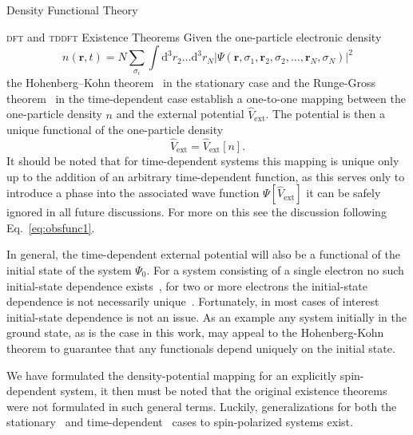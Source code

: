 \documentclass[letterpaper, 11 pt]{report}
\begin{document}
\begin{chapter}{Density Functional Theory \label{chap:dft}}
\begin{section}{\textsc{dft} and \textsc{tddft} Existence Theorems \label{sec:dft}}
      Given the one-particle electronic density
      \begin{equation} \label{eq:dendef1}
         n(\mathbf{r}, t) = N \sum\limits_{\sigma_i} \int \mathrm{d}^3 r_2 \dots \mathrm{d}^3 r_N
                            \left| \Psi(\mathbf{r}, \sigma_1, \mathbf{r}_2, \sigma_2, \dots,
                                   \mathbf{r}_N, \sigma_N) \right|^2
      \end{equation}
      the Hohenberg–Kohn theorem~\cite{hk-theorem} in the stationary case and the Runge-Gross
      theorem~\cite{rgt} in the time-dependent case establish a one-to-one mapping between the
      one-particle density $n$ and the external potential $\hat{V}_\mathrm{ext}$. The potential is
      then a unique functional of the one-particle density
      \begin{equation} \label{eq:vext-func}
         \hat{V}_\mathrm{ext} = \hat{V}_\mathrm{ext} [n].
      \end{equation}
      It should be noted that for time-dependent systems this mapping is unique only up to the addition
      of an arbitrary time-dependent function, as this serves only to introduce a phase into the
      associated wave function $\Psi[\hat{V}_\mathrm{ext}]$ it can be safely ignored in all future
      discussions. For more on this see the discussion following Eq.~\eqref{eq:obsfunc1}.

      In general, the time-dependent external potential will also be a functional of the initial state
      of the system $\Psi_0$. For a system consisting of a single electron no such initial-state
      dependence exists~\cite{initial1, initial1-erratum}, for two or more electrons the initial-state
      dependence is not necessarily unique~\cite{initial2, initial2-re, initial2-rere, initial3}.
      Fortunately, in most cases of interest initial-state dependence is not an issue. As an example
      any system initially in the ground state, as is the case in this work, may appeal to the
      Hohenberg-Kohn theorem to guarantee that any functionals depend uniquely on the initial state.

      We have formulated the density-potential mapping for an explicitly spin-dependent system, it
      then must be noted that the original existence theorems were not formulated in such general terms.
      Luckily, generalizations for both the stationary~\cite{spin-dep1, spin-dep2} and
      time-dependent~\cite{td-spindep} cases to spin-polarized systems exist.


\end{section}
\end{chapter}
\end{document}
